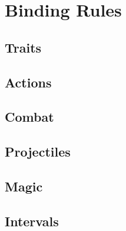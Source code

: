 \documentclass[a4paper,openany]{book}
\date{\today}
\begin{document}
\frontmatter

\section*{Binding Rules}

\physicalSkillChart

\mentalSkillChart

\begin{multicols}{2}

\subsection*{Traits}











\subsection*{Actions}






\subsection*{Combat}





\commonWeaponsChart



\commonArmourChart

\subsection*{Projectiles}



\subsection*{Magic}



\subsection*{Intervals}



\end{multicols}
\end{document}
